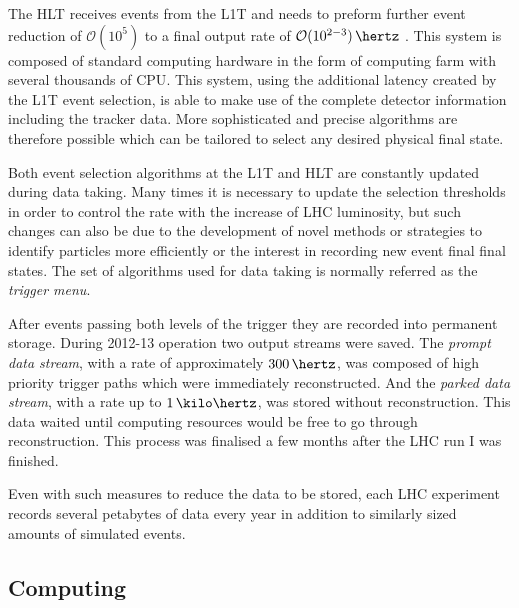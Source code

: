 The \gls{HLT} receives events from the \gls{L1T} and needs to preform further event reduction of 
$\mathcal{O}(10^{5})$ to a final output rate of $\mathcal{O}(10^{2-3})\,\hertz$ . This system is composed of standard computing hardware in the form of computing farm with several thousands of \gls{CPU}. This system, using the additional latency created by the \gls{L1T} event selection, is able to make use of the complete detector information including the tracker data. More sophisticated and precise algorithms are therefore possible which can be tailored to select any desired physical final state. 

Both event selection algorithms at the \gls{L1T} and \gls{HLT} are constantly updated during data taking. Many times it is necessary to update the selection thresholds in order to control the rate with the increase of \gls{LHC} luminosity, but such changes can also be due to the development of novel methods or strategies to identify particles more efficiently or the interest in recording new event final final states. The set of algorithms used for data taking is normally referred as the \textit{trigger menu}. 

After events passing both levels of the trigger they are recorded into permanent storage. During 2012-13 operation two output streams were saved. The \textit{prompt data stream}, with a rate of approximately $300\,\hertz$, was composed of high priority trigger paths which were immediately reconstructed. And the \textit{parked data stream}, with a rate up to $1\,\kilo\hertz$, was stored without reconstruction. This data waited until computing resources would be free to go through reconstruction\cite{ARTICLE:CMSDataParking}. This process was finalised a few months after the \gls{LHC} run I was finished.

Even with such measures to reduce the data to be stored, each \gls{LHC} experiment records several petabytes of data every year in addition to similarly sized amounts of simulated events.

\subsection{Computing}
\label{SUBSECTION:ExperimentalApparatus_CMS_Computing}


